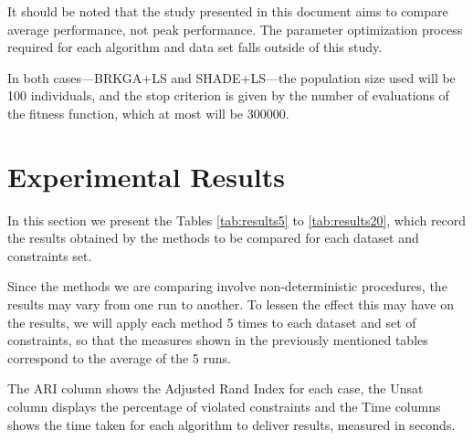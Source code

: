 \documentclass[review]{elsarticle}
\begin{document}
It should be noted that the study presented in this document aims to compare average performance, not peak performance. The parameter optimization process required for each algorithm and data set falls outside of this study.

In both cases---BRKGA+LS and SHADE+LS---the population size used will be 100 individuals, and the stop criterion is given by the number of evaluations of the fitness function, which at most will be 300000.

\section{Experimental Results}

In this section we present the Tables \ref{tab:results5} to \ref{tab:results20}, which record the results obtained by the methods to be compared for each dataset and constraints set.

Since the methods we are comparing involve non-deterministic procedures, the results may vary from one run to another. To lessen the effect this may have on the results, we will apply each method 5 times to each dataset and set of constraints, so that the measures shown in the previously mentioned tables correspond to the average of the 5 runs.

The ARI column shows the Adjusted Rand Index for each case, the Unsat column displays the percentage of violated constraints and the Time columns shows the time taken for each algorithm to deliver results, measured in seconds.
\end{document}
